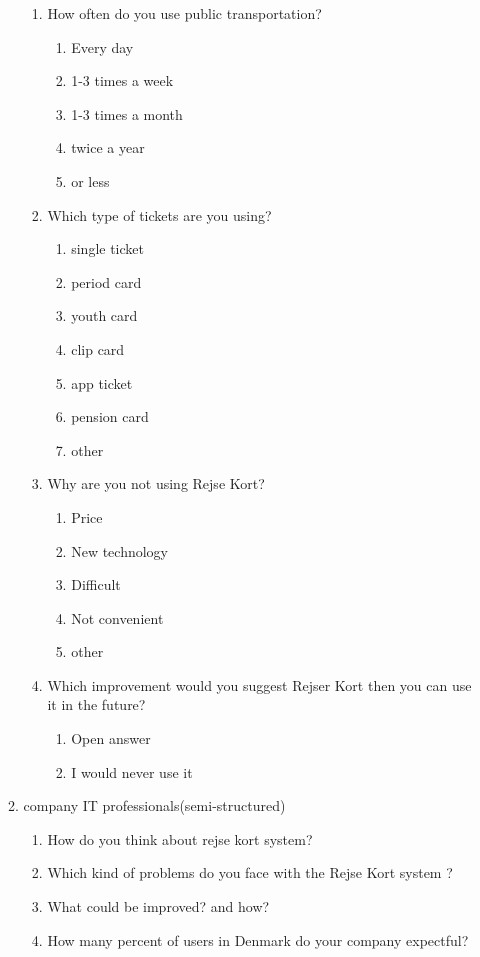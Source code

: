 \begin{enumerate}
\begin{enumerate}
\begin{enumerate}
			\item How often do you use public transportation?
				\begin{enumerate}
					\item Every day
					\item 1-3 times a week
					\item 1-3 times a month
					\item twice a year
					\item or less
				\end{enumerate}
			
			\item Which type of tickets are you using?
				\begin{enumerate}
					\item single ticket
					\item period card
					\item youth card
					\item clip card
					\item app ticket
					\item pension card
					\item other
				\end{enumerate}
			
			\item Why are you not using Rejse Kort?
				\begin{enumerate}
					\item Price
					\item New technology
					\item Difficult
					\item Not convenient
					\item other
				\end{enumerate}
			
			\item Which improvement would you suggest Rejser Kort then you can use it in the future?
				\begin{enumerate}
					\item Open answer
					\item I would never use it
				\end{enumerate}	
		\end{enumerate}%
	
	\item company IT professionals(semi-structured)
		\begin{enumerate}
			\item How do you think about rejse kort system?
			\item Which kind of problems do you face with the Rejse Kort system ?
			\item What could be improved? and how?
			\item How many percent of users in Denmark do your company expectful? 
		\end{enumerate}
		

\end{enumerate}
\end{enumerate}
